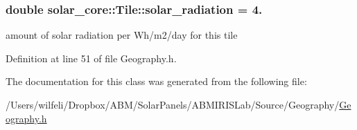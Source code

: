 \hypertarget{classsolar__core_1_1_tile_aae222e441b1dfe68cc6b78bb946f5e02}{}
\subsubsection[{solar\+\_\+radiation}]{\setlength{\rightskip}{0pt plus 5cm}double solar\+\_\+core\+::\+Tile\+::solar\+\_\+radiation = 4.}\label{classsolar__core_1_1_tile_aae222e441b1dfe68cc6b78bb946f5e02}
amount of solar radiation per Wh/m2/day for this tile 

Definition at line 51 of file Geography.\+h.



The documentation for this class was generated from the following file\+:\begin{DoxyCompactItemize}
\item 
/\+Users/wilfeli/\+Dropbox/\+A\+B\+M/\+Solar\+Panels/\+A\+B\+M\+I\+R\+I\+S\+Lab/\+Source/\+Geography/\hyperlink{_geography_8h}{Geography.\+h}\end{DoxyCompactItemize}

